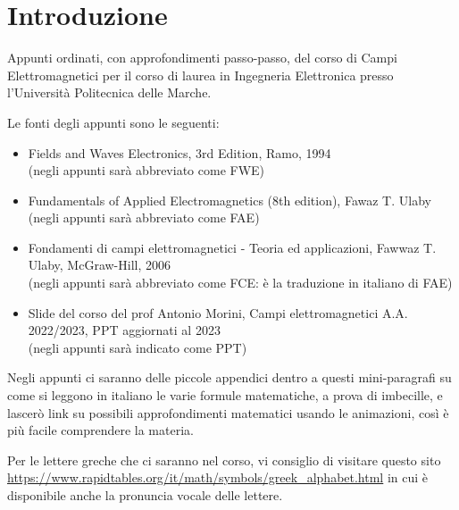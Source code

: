 \section*{Introduzione}

 

Appunti ordinati, con approfondimenti passo-passo, del corso di Campi Elettromagnetici per il corso di laurea in Ingegneria Elettronica 
presso l’Università Politecnica delle Marche. \newline
        



Le fonti degli appunti sono le seguenti: 

\begin{itemize}
    
    \item Fields and Waves Electronics, 3rd Edition, Ramo, 1994 
    \\(negli appunti sarà abbreviato come FWE) 
    
    \item  Fundamentals of Applied Electromagnetics (8th edition), Fawaz T. Ulaby 
    \\(negli appunti sarà abbreviato come FAE) 

    \item Fondamenti di campi elettromagnetici - Teoria ed applicazioni, Fawwaz T. Ulaby, McGraw-Hill, 2006 
    \\(negli appunti sarà abbreviato come FCE: è la traduzione in italiano di FAE)
    
    \item Slide del corso del prof Antonio Morini, Campi elettromagnetici A.A. 2022/2023, PPT aggiornati al 2023
    \\(negli appunti sarà indicato come PPT) 
    

\end{itemize}

\begin{tcolorbox}
    Negli appunti ci saranno delle piccole appendici dentro a questi mini-paragrafi  
    su come si leggono in italiano le varie formule matematiche, 
    a prova di imbecille,  
    e lascerò link su possibili approfondimenti matematici usando le animazioni, 
    così è più facile comprendere la materia.
\end{tcolorbox}


Per le lettere greche che ci saranno nel corso, vi consiglio di visitare questo sito \\ 
\url{https://www.rapidtables.org/it/math/symbols/greek_alphabet.html} \break 
in cui è disponibile anche la pronuncia vocale delle lettere. \newline

